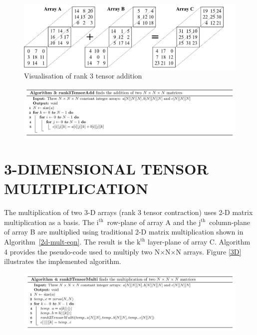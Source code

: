 \begin{figure}[H]
	\centering
	\includegraphics[scale=0.5]{build/AdditionDiagram_3D.png}
	\vspace{3mm}
	\caption{Visualisation of rank 3 tensor addition}
	\label{fig:3Dadd}
\end{figure}

\vspace{-2mm}
\begin{figure}[H]
\includegraphics[width=\textwidth]{build/Algo3.png}
\end{figure}

\section{3-DIMENSIONAL TENSOR MULTIPLICATION} \label{3Dmult}

The multiplication of two 3-D arrays (rank 3 tensor contraction) uses 2-D matrix multiplication as a basis. The $\text{i}^\text{th}$~row-plane of array A and the $\text{j}^\text{th}$~column-plane of array B are multiplied using traditional 2-D matrix multiplication shown in Algorithm~\ref{2d-mult-eqn}. The result is the $\text{k}^\text{th}$ layer-plane of array C. Algorithm 4 provides the pseudo-code used to multiply two N$\times$N$\times$N arrays. Figure \ref{3D} illustrates the implemented algorithm.

\begin{figure}[H]
\includegraphics[width=\textwidth]{build/Algo4.png}
\end{figure}

